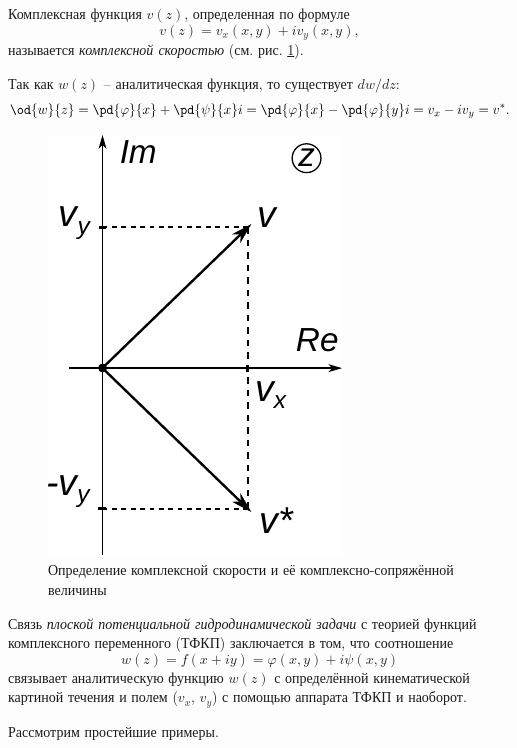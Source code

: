 \documentclass[14pt]{extarticle}
\begin{document}
		
\begin{dfn}
	Комплексная функция $v(z)$, определенная по формуле
	\[
	v(z) = v_x(x,y) + i v_y(x,y),
	\] 
	называется  \textit{комплексной скоростью} (см. рис. \ref{fig:v_complex_dfn}).
\end{dfn}

Так как $w(z)$ -- аналитическая функция, то существует $dw/dz$:
\[
\od{w}{z} = \pd{\varphi}{x}+\pd{\psi}{x} i = 
\pd{\varphi}{x}-\pd{\varphi}{y} i = v_x-i v_y = v^*. 
\]

\begin{figure}
	\centering
	\includegraphics[width=0.3\linewidth]{../img/v_star.pdf}
	\caption{Определение комплексной скорости и её комплексно-сопряжённой величины}
	\label{fig:v_complex_dfn}
\end{figure}
					
Связь \textit{плоской потенциальной гидродинамической задачи} с теорией функций комплексного переменного (ТФКП) заключается в том, что соотношение
\[
w(z) = f(x+iy) = \varphi(x,y) + i  \psi(x,y)
\]
связывает аналитическую функцию $w(z)$ с определённой кинематической картиной течения и полем ($v_x$, $v_y$) с помощью аппарата ТФКП и наоборот.

\bigskip
Рассмотрим простейшие примеры.
\end{document}

